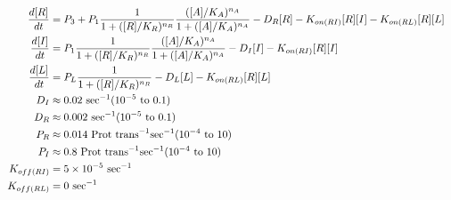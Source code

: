 \documentclass{article}
\begin{document}
\Large
\begin{align*}
    \frac{d[R]}{dt} &= P_{3} + P_{1}\frac{1}{1 + ([R]/K_R)^{n_R}}\frac{([A]/K_A)^{n_A}}{1 + ([A]/K_A)^{n_A}} - D_{R}  [R] - K_{on(RI)} [R] [I] - K_{on(RL)}[R][L]  \cr
    \frac{d[I]}{dt} &= P_{1}\frac{1}{1 + ([R]/K_R)^{n_R}}\frac{([A]/K_A)^{n_A}}{1 + ([A]/K_A)^{n_A}} - D_{I}  [I] - K_{on(RI)} [R] [I]    \cr
    \frac{d[L]}{dt} &= P_{L}\frac{1}{1 + ([R]/K_{R})^{n_{R}}}   - D_{L}  [L] - K_{on(RL)}  [R][L]  \cr
    D_{I}&\approx0.02\  \text{sec}^{-1}     (10^{-5} \ \text{to} \ 0.1 )  \cr
    D_{R}&\approx0.002\  \text{sec}^{-1}     (10^{-5} \ \text{to} \ 0.1 )  \cr
    P_{R}&\approx0.014\  \text{Prot trans}^{-1} \text{sec}^{-1}    (10^{-4} \ \text{to} \ 10 )  \cr
    P_{I}&\approx0.8\  \text{Prot trans}^{-1} \text{sec}^{-1}    (10^{-4} \ \text{to} \ 10 )  \cr
    K_{off(RI)}&= 5 \times 10^{-5}\  \text{sec}^{-1} \cr
    K_{off(RL)}&= 0\  \text{sec}^{-1} \cr
\end{align*}
\end{document}
